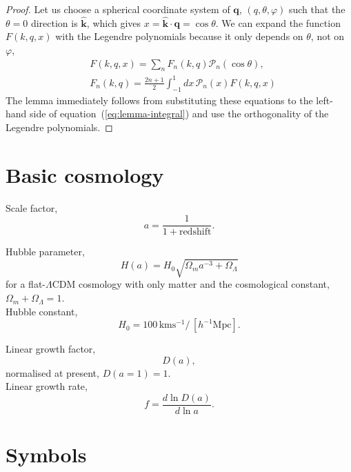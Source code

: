 \documentclass[a4paper,11pt, fleqn]{article}
\begin{document}
\begin{proof}
Let us choose a spherical coordinate system of $\bm{q}$, $(q, \theta,
\varphi)$ such that the $\theta = 0$ direction is $\hat{\bm{k}}$,
which gives $x = \hat{\bm{k}}\cdot\bm{\bm{q}} = \cos\theta$. We can expand
the function $F(k, q, x)$ with the Legendre polynomials because it
only depends on $\theta$, not on $\varphi$,
\begin{align}
  &F(k, q, x) = \sum_n F_{n}(k, q) \mathcal{P}_n(\cos\theta),\\
  &F_{n}(k, q) = \frac{2n + 1}{2} \int_{-1}^1 \! dx \,\mathcal{P}_n(x) F(k, q, x)
\end{align}
The lemma immediately follows from substituting these equations to the
left-hand side of equation~(\ref{eq:lemma-integral}) and use the
orthogonality of the Legendre polynomials.
\end{proof}


\clearpage
\section{Basic cosmology}

Scale factor,
\begin{equation}
  a = \frac{1}{1 + \mathrm{redshift}}.
\end{equation}

Hubble parameter,
\begin{equation}
  H(a) = H_0 \sqrt{\Omega_m a^{-3} + \Omega_\Lambda}
\end{equation}
for a flat-$\Lambda$CDM cosmology with only matter and the
cosmological constant, $\Omega_m + \Omega_\Lambda = 1$.\\

Hubble constant,
\begin{equation}
  H_0 = 100\,\mathrm{km}\mathrm{s}^{-1} / \,[h^{-1} \mathrm{Mpc}].
\end{equation}


Linear growth factor,
\begin{equation}
  D(a),
\end{equation}
normalised at present, $D(a=1) = 1$.\\

Linear growth rate,
\begin{equation}
  f = \frac{d\ln D(a)}{d\ln a}.
\end{equation}

%
%
\clearpage
\section{Symbols}
\end{document}
